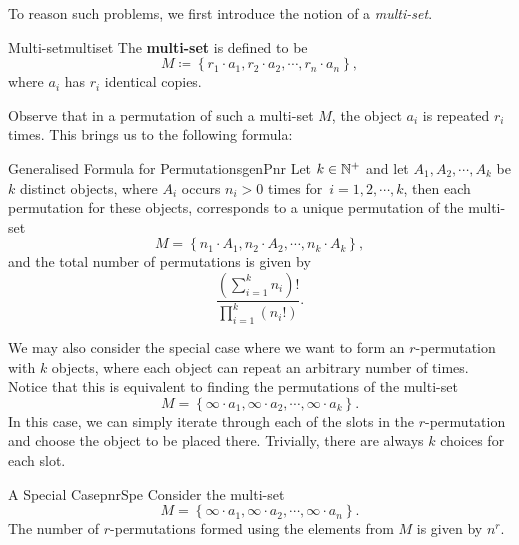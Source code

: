 \documentclass[math]{amznotes}
\theoremstyle{remark}
\begin{document}
To reason such problems, we first introduce the notion of a \textit{multi-set}.
\begin{dfnbox}{Multi-set}{multiset}
    The {\color{red} \textbf{multi-set}} is defined to be
    \begin{equation*}
        M \coloneqq \left\{r_1 \cdot a_1, r_2 \cdot a_2, \cdots, r_n \cdot a_n\right\},
    \end{equation*}
    where $a_i$ has $r_i$ identical copies.
\end{dfnbox}
Observe that in a permutation of such a multi-set $M$, the object $a_i$ is repeated $r_i$ times. This brings us to the following formula:
\begin{probox}{Generalised Formula for Permutations}{genPnr}
    Let $k \in \mathbb{N}^+$ and let $A_1, A_2, \cdots, A_k$ be $k$ distinct objects, where $A_i$ occurs $n_i > 0$ times for~$i = 1, 2, \cdots, k$, then each permutation for these objects, corresponds to a unique permutation of the multi-set
    \begin{displaymath}
        M = \left\{n_1 \cdot A_1, n_2 \cdot A_2, \cdots, n_k \cdot A_k\right\},
    \end{displaymath}
    and the total number of permutations is given by
    \begin{equation*}
        \frac{\left(\sum_{i = 1}^{k}n_i\right)!}{\prod_{i = 1}^{k}\left(n_i!\right)}.
    \end{equation*}
\end{probox}
We may also consider the special case where we want to form an $r$-permutation with $k$ objects, where each object can repeat an arbitrary number of times. Notice that this is equivalent to finding the permutations of the multi-set
\begin{displaymath}
    M = \left\{\infty \cdot a_1, \infty \cdot a_2, \cdots, \infty \cdot a_k\right\}.
\end{displaymath}
In this case, we can simply iterate through each of the slots in the $r$-permutation and choose the object to be placed there. Trivially, there are always $k$ choices for each slot.
\begin{probox}{A Special Case}{pnrSpe}
    Consider the multi-set
    \begin{displaymath}
        M = \left\{\infty \cdot a_1, \infty \cdot a_2, \cdots, \infty \cdot a_n\right\}.
    \end{displaymath}
    The number of $r$-permutations formed using the elements from $M$ is given by $n^r$.
\end{probox}
\end{document}
